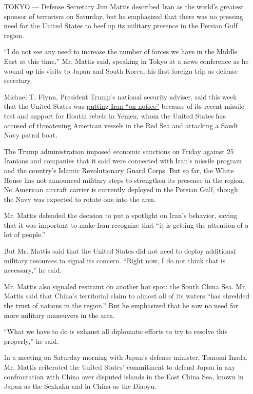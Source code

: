 TOKYO --- Defense Secretary Jim Mattis described Iran as the world's
greatest sponsor of terrorism on Saturday, but he emphasized that there
was no pressing need for the United States to beef up its military
presence in the Persian Gulf region.

``I do not see any need to increase the number of forces we have in the
Middle East at this time,'' Mr. Mattis said, speaking in Tokyo at a news
conference as he wound up his visits to Japan and South Korea, his first
foreign trip as defense secretary.

Michael T. Flynn, President Trump's national security adviser, said this
week that the United States was
\href{https://www.nytimes.com/2017/02/01/world/middleeast/iran-missile-test.html}{putting
Iran ``on notice''} because of its recent missile test and support for
Houthi rebels in Yemen, whom the United States has accused of
threatening American vessels in the Red Sea and attacking a Saudi Navy
patrol boat.

The Trump administration imposed economic sanctions on Friday against 25
Iranians and companies that it said were connected with Iran's missile
program and the country's Islamic Revolutionary Guard Corps. But so far,
the White House has not announced military steps to strengthen its
presence in the region. No American aircraft carrier is currently
deployed in the Persian Gulf, though the Navy was expected to rotate one
into the area.

Mr. Mattis defended the decision to put a spotlight on Iran's behavior,
saying that it was important to make Iran recognize that ``it is getting
the attention of a lot of people.''

But Mr. Mattis said that the United States did not need to deploy
additional military resources to signal its concern. ``Right now, I do
not think that is necessary,'' he said.

Mr. Mattis also signaled restraint on another hot spot: the South China
Sea. Mr. Mattis said that China's territorial claim to almost all of its
waters ``has shredded the trust of nations in the region.'' But he
emphasized that he saw no need for more military maneuvers in the area.

``What we have to do is exhaust all diplomatic efforts to try to resolve
this properly,'' he said.

In a meeting on Saturday morning with Japan's defense minister, Tomomi
Inada, Mr. Mattis reiterated the United States' commitment to defend
Japan in any confrontation with China over disputed islands in the East
China Sea, known in Japan as the Senkaku and in China as the Diaoyu.

